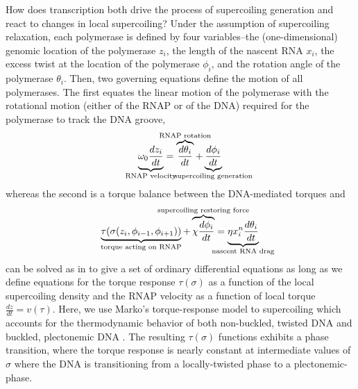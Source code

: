 \documentclass[11pt]{article}
\begin{document}
How does transcription both drive the process of supercoiling generation and react to changes in local supercoiling? Under the assumption of supercoiling relaxation, each polymerase is defined by four variables--the (one-dimensional) genomic location of the polymerase \(z_i\), the length of the nascent RNA \(x_i\), the excess twist at the location of the polymerase \(\phi_i\), and the rotation angle of the polymerase \(\theta_i\). Then, two governing equations define the motion of all polymerases. The first equates the linear motion of the polymerase with the rotational motion (either of the RNAP or of the DNA) required for the polymerase to track the DNA groove,
\begin{equation}
    \underbrace{\omega_0 \frac{dz_i}{dt}}_{\mathclap{\text{RNAP velocity}}} = \overbrace{\frac{d\theta_i}{dt}}^{\mathclap{\text{RNAP rotation}}} + \underbrace{\frac{d\phi_i}{dt}}_{\mathclap{\text{supercoiling generation}}}
\label{eq:linear_rotational_balance}
\end{equation}
whereas the second is a torque balance between the DNA-mediated torques and
\begin{equation}
    \underbrace{\tau(\sigma(z_i, \phi_{i-1}, \phi_{i+1}))}_{\mathclap{\text{torque acting on RNAP}}} + \overbrace{\chi \frac{d\phi_i}{dt}}^{\mathclap{\text{supercoiling restoring force}}}= \underbrace{\eta x_i^n \frac{d\theta_i}{dt}}_{\mathclap{\text{nascent RNA drag}}}
\label{eq:torque_balance}
\end{equation}
 can be solved as in \textcite{sevierPropertiesGeneExpression2018} to give a set of ordinary differential equations as long as we define equations for the torque response \(\tau(\sigma)\) as a function of the local supercoiling density and the RNAP velocity as a function of local torque \(\frac{dz}{dt} = v(\tau)\). Here, we use Marko's torque-response model to supercoiling which accounts for the thermodynamic behavior of both non-buckled, twisted DNA and buckled, plectonemic DNA \parencite{markoTorqueDynamicsLinking2007}. The resulting \(\tau(\sigma)\) functions exhibits a phase transition, where the torque response is nearly constant at intermediate values of \(\sigma\) where the DNA is transitioning from a locally-twisted phase to a plectonemic-phase.
\end{document}
